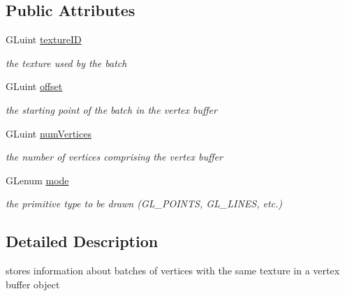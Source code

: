 \subsection*{Public Attributes}
\begin{DoxyCompactItemize}
\item 
\mbox{\label{structnta_1_1RenderBatch_a65aa121e11783396f753c8f937fe9d04}} 
G\+Luint \hyperlink{structnta_1_1RenderBatch_a65aa121e11783396f753c8f937fe9d04}{texture\+ID}
\begin{DoxyCompactList}\small\item\em the texture used by the batch \end{DoxyCompactList}\item 
\mbox{\label{structnta_1_1RenderBatch_ab73ef79a5cbf8b60ad9991eb0a1ea9e6}} 
G\+Luint \hyperlink{structnta_1_1RenderBatch_ab73ef79a5cbf8b60ad9991eb0a1ea9e6}{offset}
\begin{DoxyCompactList}\small\item\em the starting point of the batch in the vertex buffer \end{DoxyCompactList}\item 
\mbox{\label{structnta_1_1RenderBatch_a18e1cb5ff84364540a871db321557b7c}} 
G\+Luint \hyperlink{structnta_1_1RenderBatch_a18e1cb5ff84364540a871db321557b7c}{num\+Vertices}
\begin{DoxyCompactList}\small\item\em the number of vertices comprising the vertex buffer \end{DoxyCompactList}\item 
\mbox{\label{structnta_1_1RenderBatch_ae2cc5e3b2e34aff278ba863443b0fdae}} 
G\+Lenum \hyperlink{structnta_1_1RenderBatch_ae2cc5e3b2e34aff278ba863443b0fdae}{mode}
\begin{DoxyCompactList}\small\item\em the primitive type to be drawn (G\+L\+\_\+\+P\+O\+I\+N\+TS, G\+L\+\_\+\+L\+I\+N\+ES, etc.) \end{DoxyCompactList}\end{DoxyCompactItemize}


\subsection{Detailed Description}
stores information about batches of vertices with the same texture in a vertex buffer object 

